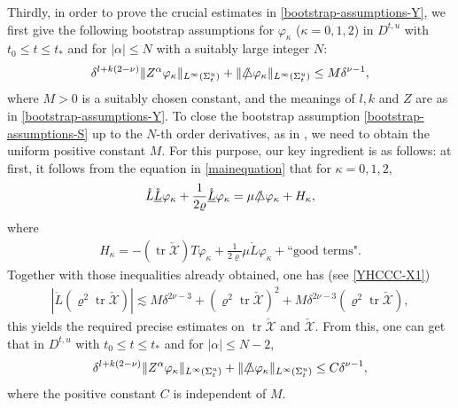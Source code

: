 \documentclass[11pt,twoside]{article}
\def\vp{\varphi}
\begin{document}
Thirdly, in order to prove the crucial estimates in \eqref{bootstrap-assumptions-Y}, we first
give the following bootstrap assumptions for $\vp_{\kappa}$ ($\kappa=0,1,2$) in $D^{t,u}$ with $t_0\leq t \leq t_*$ and for
$|\alpha|\le N$ with a suitably large integer $N$:
\begin{equation}\label{bootstrap-assumptions-S}
\delta^{l+k(2-\nu)} \| Z^{\alpha}\vp_{\kappa} \|_{L^{\infty}(\Sigma_t^u)}+\|\slashed\triangle\vp_{\kappa}\|_{L^{\infty}(\Sigma_t^u)}
\le M\delta^{\nu-1},
\end{equation}
where $M>0$ is a suitably chosen constant, and the meanings of $l,k$ and $Z$ are as in \eqref{bootstrap-assumptions-Y}.
To close the bootstrap assumption \eqref{bootstrap-assumptions-S} up to the $N$-th order derivatives,
as in \cite{Ch2, K-R, M-Y, L-Y}, we need to obtain the
uniform positive constant $M$. For this purpose, our key ingredient is as follows: at first, it follows from the equation
in \eqref{mainequation} that for $\kappa=0,1,2,$
\begin{equation}\label{fequation-Y}
\mathring{L}\mathring{\underline{L}}\varphi_\kappa + \frac{1}{2\varrho}\mathring{\underline{L}}\varphi_\kappa
= \mu\slashed{\triangle}\varphi_\kappa + H_\kappa,
\end{equation}
where \begin{equation}\label{H-Y}
\begin{split}
H_\kappa=-\left(\operatorname{tr}\check{\mathscr X}\right) T\varphi_\kappa+\frac{1}{2\varrho}\mu\mathring{L}\varphi_\kappa+
\text{``good terms".}
\end{split}
\end{equation}
Together with those inequalities already obtained, one has (see \eqref{YHCCC-X1})
\begin{align*}
|\mathring{L}(\varrho^2\operatorname{tr}\check{\mathscr{X}})| \lesssim M\delta^{2\nu-3} + (\varrho^2\operatorname{tr}\check{\mathscr{X}})^2 + M\delta^{2\nu-3}(\varrho^2\operatorname{tr}\check{\mathscr{X}}),
\end{align*}
this yields the required precise estimates on $\operatorname{tr}\check{\mathscr{X}}$ and $\check{\mathscr{X}}$.
From this, one can get that in $D^{t,u}$ with $t_0\leq t \leq t_*$ and for
$|\alpha|\le N-2$,
\begin{equation}\label{YHCCC-X2}
\delta^{l+k(2-\nu)} \| Z^{\alpha}\vp_{\kappa} \|_{L^{\infty}(\Sigma_t^u)}+\|\slashed\triangle\vp_{\kappa}\|_{L^{\infty}(\Sigma_t^u)}
\le C\delta^{\nu-1},
\end{equation}
where the positive constant $C$ is independent of $M$.
\end{document}
